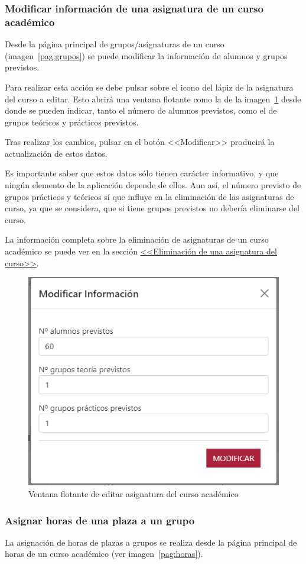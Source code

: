 \subsubsection{Modificar información de una asignatura de un curso académico}
Desde la página principal de grupos/asignaturas de un curso (imagen~\ref{pag:grupos}) se puede modificar la información de alumnos y grupos previstos.

Para realizar esta acción se debe pulsar sobre el icono del lápiz de la asignatura del curso a editar. 
Esto abrirá una ventana flotante como la de la imagen~\ref{pag:flotanteEditarAsig} desde donde se pueden indicar, tanto el número de alumnos previstos, como el de grupos teóricos y prácticos previstos.

Tras realizar los cambios, pulsar en el botón <<Modificar>> producirá la actualización de estos datos.

Es importante saber que estos datos sólo tienen carácter informativo, y que ningún elemento de la aplicación depende de ellos. Aun así, el número previsto de grupos prácticos y teóricos sí que influye en la eliminación de las asignaturas de curso, ya que se considera, que si tiene grupos previstos no debería eliminarse del curso.

La información completa sobre la eliminación de asignaturas de un curso académico se puede ver en la sección \hyperref[section:eliminarAsigCurso]{<<Eliminación de una asignatura del curso>>}.

\begin{figure}
	\centering
	\includegraphics[width=.65\textwidth]{../img/Anexos/Manual usuario/flotanteEditarAsig.png}
	\caption{Ventana flotante de editar asignatura del curso académico}\label{pag:flotanteEditarAsig}
\end{figure}

\subsubsection{Asignar horas de una plaza a un grupo}
La asignación de horas de plazas a grupos se realiza desde la página principal de horas de un curso académico (ver imagen~\ref{pag:horas}).

